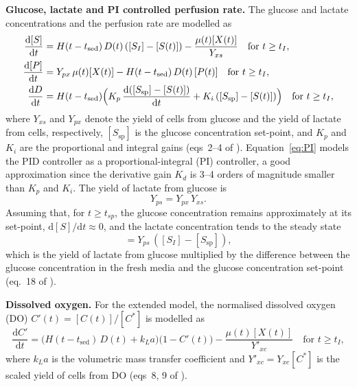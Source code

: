\documentclass[11pt,a4paper]{article}
\newcommand{\dd}{\mathrm{d}}
\newcommand{\kla}{k_La}
\newcommand{\tsed}{t_{\mathrm{sed}}}
\newcommand{\Ssp}{[S_{\mathrm{sp}}]}
\newcommand{\cS}{[S(t)]}
\newcommand{\cP}{[P(t)]}
\newcommand{\cX}{[X(t)]}
\begin{document}
\textbf{Glucose, lactate and PI controlled perfusion rate.} The glucose and lactate concentrations
and the perfusion rate are modelled as
\begin{align}
  \frac{\dd[S]}{\dd t} &= H(t-\tsed)\,D(t)\,([S_I] - \cS) - \frac{\mu(t)\cX}{Y_{xs}} \quad \text{for } t\ge t_I, \label{eq:S}\\
  \frac{\dd[P]}{\dd t} &= Y_{px}\,\mu(t)\cX - H(t-\tsed)\,D(t)\,\cP \quad \text{for } t\ge t_I, \label{eq:P}\\
  \frac{\dd D}{\dd t} &= H(t-\tsed)\Bigl(K_p\,\frac{\dd(\Ssp - \cS)}{\dd t} + K_i\,(\Ssp - \cS)\Bigr) \quad \text{for } t\ge t_I, \label{eq:PI}
\end{align}
where $Y_{xs}$ and $Y_{px}$ denote the yield of cells from glucose and the yield of lactate from
cells, respectively, $\Ssp$ is the glucose concentration set-point, and $K_p$ and $K_i$ are the
proportional and integral gains (eqs~2--4 of \cite{egan2025}). Equation~\eqref{eq:PI} models the PID
controller as a proportional-integral (PI) controller, a good approximation since the derivative
gain $K_d$ is 3--4 orders of magnitude smaller than $K_p$ and $K_i$. The yield of lactate from
glucose is
\begin{equation}
  Y_{ps} = Y_{px}\,Y_{xs}. \label{eq:Yps}
\end{equation}
Assuming that, for $t\ge t_{sp}$, the glucose concentration remains approximately at its set-point,
$\dd[S]/\dd t\approx 0$, and the lactate concentration tends to the steady state
\begin{equation}
  [P_{ss}] = Y_{ps}\,([S_I] - \Ssp), \label{eq:Pss}
\end{equation}
which is the yield of lactate from glucose multiplied by the difference between the glucose
concentration in the fresh media and the glucose concentration set-point (eq.~18 of \cite{egan2025}).

\textbf{Dissolved oxygen.} For the extended model, the normalised dissolved oxygen (DO)
$C'(t)=[C(t)]/[C^*]$ is modelled as
\begin{equation}
  \frac{\dd C'}{\dd t} = \bigl(H(t-\tsed)\,D(t) + \kla\bigr)\bigl(1 - C'(t)\bigr) - \frac{\mu(t)\cX}{Y'_{xc}}
  \quad \text{for } t\ge t_I, \label{eq:DO}
\end{equation}
where $\kla$ is the volumetric mass transfer coefficient and $Y'_{xc}=Y_{xc}[C^*]$ is the scaled yield
of cells from DO (eqs~8, 9 of \cite{egan2025}).
\end{document}

